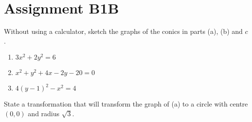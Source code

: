 \section{Assignment B1B}

\begin{problem}
    Without using a calculator, sketch the graphs of the conics in parts (a), (b) and $c$.

    \begin{enumerate}
        \item $3x^2 + 2y^2 = 6$
        \item $x^2 + y^2 + 4x - 2y - 20 = 0$
        \item $4(y-1)^2 - x^2 = 4$
    \end{enumerate}

    State a transformation that will transform the graph of (a) to a circle with centre $(0, 0)$ and radius $\sqrt3$.
\end{problem}
